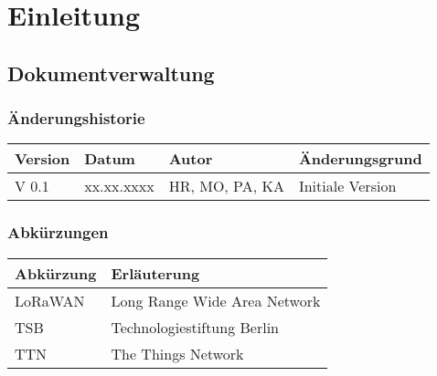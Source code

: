 \documentclass[
11pt,
a4paper,
ngerman,
]{article}
\begin{document}
\tableofcontents
\listoffigures
\listoftables

\newpage

\section{Einleitung}

\subsection{Dokumentverwaltung}

\subsubsection{Änderungshistorie}

\begin{tabularx}{\textwidth}{ |X|X|X|X| }
	\hline
	\rowcolor[gray]{.8}
	\rule{0pt}{18pt}
	\textbf{ Version } & \textbf{ Datum } & \textbf{ Autor } & \textbf{ Änderungsgrund } \\
	\hline 
	V 0.1 & xx.xx.xxxx & HR, MO, PA, KA & Initiale Version \\
	\hline
\end{tabularx}

\subsubsection{Abkürzungen}
\begin{table}[h]
	\centering
	\begin{tabular}{ |l|l| }
		\hline  %
		\rowcolor[gray]{.8}
		\rule{0pt}{18pt}
		\textbf{ Abkürzung } & \textbf{ Erläuterung } \\
		\hline
		LoRaWAN & Long Range Wide Area Network \\
		\hline
		TSB & Technologiestiftung Berlin \\
		\hline
		TTN & The Things Network \\
		\hline
	\end{tabular}
\end{table}
\end{document}
